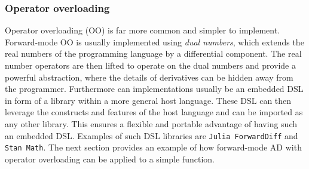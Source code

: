 \subsubsection*{Operator overloading}
Operator overloading (OO) is far more common and simpler to implement.
Forward-mode OO is usually implemented using \emph{dual numbers}, which extends the real numbers 
of the programming language by a differential component. The real number operators are then lifted to
operate on the dual numbers and provide a powerful abstraction, where the details of derivatives can 
be hidden away from the programmer. Furthermore can implementations usually be an embedded DSL in form of a library 
within a more general host language. These DSL can then leverage the constructs and features of the host language and can be imported
as any other library. This ensures a flexible and portable advantage of having such an embedded DSL. Examples of such DSL libraries are 
\texttt{Julia ForwardDiff}\cite{RevelsLubinPapamarkou2016} and \texttt{Stan Math}\cite{DBLP:journals/corr/CarpenterHBLLB15}. 
The next section provides an example of how forward-mode AD with operator overloading can be applied to a simple
function. 



